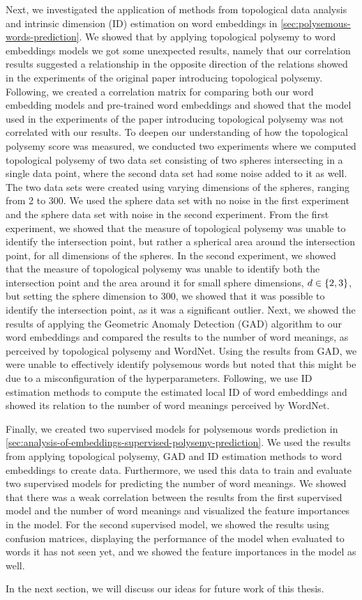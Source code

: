 Next, we investigated the application of methods from topological data analysis and intrinsic dimension (ID) estimation on word embeddings in \cref{sec:polysemous-words-prediction}. We showed that by applying topological polysemy to word embeddings models we got some unexpected results, namely that our correlation results suggested a relationship in the opposite direction of the relations showed in the experiments of the original paper introducing topological polysemy. Following, we created a correlation matrix for comparing both our word embedding models and pre-trained word embeddings and showed that the model used in the experiments of the paper introducing topological polysemy was not correlated with our results. To deepen our understanding of how the topological polysemy score was measured, we conducted two experiments where we computed topological polysemy of two data set consisting of two spheres intersecting in a single data point, where the second data set had some noise added to it as well. The two data sets were created using varying dimensions of the spheres, ranging from 2 to 300. We used the sphere data set with no noise in the first experiment and the sphere data set with noise in the second experiment. From the first experiment, we showed that the measure of topological polysemy was unable to identify the intersection point, but rather a spherical area around the intersection point, for all dimensions of the spheres. In the second experiment, we showed that the measure of topological polysemy was unable to identify both the intersection point and the area around it for small sphere dimensions, $d \in \left\{2, 3\right\}$, but setting the sphere dimension to 300, we showed that it was possible to identify the intersection point, as it was a significant outlier. Next, we showed the results of applying the Geometric Anomaly Detection (GAD) algorithm to our word embeddings and compared the results to the number of word meanings, as perceived by topological polysemy and WordNet. Using the results from GAD, we were unable to effectively identify polysemous words but noted that this might be due to a misconfiguration of the hyperparameters. Following, we use ID estimation methods to compute the estimated local ID of word embeddings and showed its relation to the number of word meanings perceived by WordNet.

Finally, we created two supervised models for polysemous words prediction in \cref{sec:analysis-of-embeddings-supervised-polysemy-prediction}. We used the results from applying topological polysemy, GAD and ID estimation methods to word embeddings to create data. Furthermore, we used this data to train and evaluate two supervised models for predicting the number of word meanings. We showed that there was a weak correlation between the results from the first supervised model and the number of word meanings and visualized the feature importances in the model. For the second supervised model, we showed the results using confusion matrices, displaying the performance of the model when evaluated to words it has not seen yet, and we showed the feature importances in the model as well.

In the next section, we will discuss our ideas for future work of this thesis.